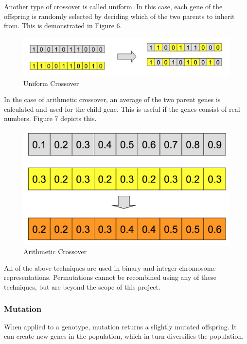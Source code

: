 \documentclass[12pt,a4paper]{article}
\begin{document}
Another type of crossover is called uniform. In this case, each gene of the offspring is randomly selected by deciding which of the two parents to inherit from. This is demonstrated in Figure 6.

\begin{figure}[h]
	\centering
	\includegraphics[width = \textwidth]{UniformCrossover.png}
	\caption{Uniform Crossover}
\end{figure}


In the case of arithmetic crossover, an average of the two parent genes is calculated and used for the child gene. This is useful if the genes consist of real numbers. Figure 7 depicts this.

\begin{figure}[h]
	\centering
	\includegraphics[width = \textwidth]{ArithmeticCrossover.png}
	\caption{Arithmetic Crossover}
\end{figure}

All of the above techniques are used in binary and integer chromosome representations. Permutations cannot be recombined using any of these techniques, but are beyond the scope of this project. 

\subsubsection{Mutation}
When applied to a genotype, mutation returns a slightly mutated offspring\citep{IntroductionToEvolutionaryComputing}. It can create new genes in the population, which in turn diversifies the population. 
\end{document}
